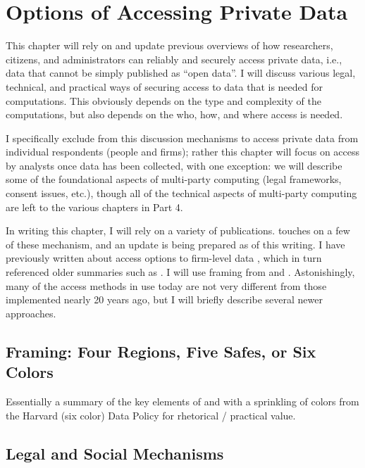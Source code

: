 \chapter{Options of Accessing Private Data}

This chapter will rely on and update previous overviews of how researchers, citizens, and administrators can reliably and securely access private data, i.e., data that cannot be simply published as ``open data''. I will discuss various legal, technical, and practical ways of securing access to data that is needed for computations. This obviously depends on the type and complexity of the computations, but also depends on the who, how, and where access is needed.

I specifically exclude from this discussion mechanisms to access private data from individual respondents (people and firms); rather this chapter will focus on access by analysts once data has been collected, with one exception: we will describe some of the foundational aspects of multi-party computing (legal frameworks, consent issues, etc.), though all of the technical aspects of multi-party computing are left to the various chapters in Part 4.

In writing this chapter, I will rely on a variety of publications. \cite{fcsm_report_2005} touches on a few of these mechanism, and an update is being prepared as of this writing. I have previously written about access options to firm-level data \cite{vilhuber_methods_2013}, which in turn referenced older summaries such as \cite{weinberg_access_2007}. I will use framing from \cite{desai_five_2016} and \cite{altman_towards_2015}. Astonishingly, many of the access methods in use today are not very different from those implemented nearly 20 years ago, but I will briefly describe several newer approaches. 

\section{Framing: Four Regions, Five Safes, or Six Colors}

Essentially a summary of the key elements of \cite{altman_towards_2015} and \cite{desai_five_2016} with a sprinkling of colors from the Harvard (six color) Data Policy for rhetorical / practical value.

\section{Legal and Social Mechanisms}


